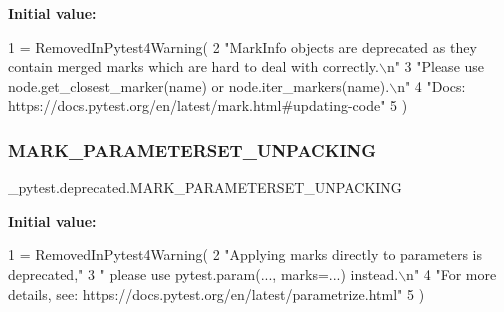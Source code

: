 {\bfseries Initial value\+:}
\begin{DoxyCode}
1 =  RemovedInPytest4Warning(
2     \textcolor{stringliteral}{"MarkInfo objects are deprecated as they contain merged marks which are hard to deal with correctly.\(\backslash\)n"}
3     \textcolor{stringliteral}{"Please use node.get\_closest\_marker(name) or node.iter\_markers(name).\(\backslash\)n"}
4     \textcolor{stringliteral}{"Docs: https://docs.pytest.org/en/latest/mark.html#updating-code"}
5 )
\end{DoxyCode}
\mbox{\label{namespace__pytest_1_1deprecated_a00e2270a0357aece5e55bbf0d1acfd90}} 
\subsubsection{\texorpdfstring{M\+A\+R\+K\+\_\+\+P\+A\+R\+A\+M\+E\+T\+E\+R\+S\+E\+T\+\_\+\+U\+N\+P\+A\+C\+K\+I\+NG}{MARK\_PARAMETERSET\_UNPACKING}}
{\footnotesize\ttfamily \+\_\+pytest.\+deprecated.\+M\+A\+R\+K\+\_\+\+P\+A\+R\+A\+M\+E\+T\+E\+R\+S\+E\+T\+\_\+\+U\+N\+P\+A\+C\+K\+I\+NG}

{\bfseries Initial value\+:}
\begin{DoxyCode}
1 =  RemovedInPytest4Warning(
2     \textcolor{stringliteral}{"Applying marks directly to parameters is deprecated,"}
3     \textcolor{stringliteral}{" please use pytest.param(..., marks=...) instead.\(\backslash\)n"}
4     \textcolor{stringliteral}{"For more details, see: https://docs.pytest.org/en/latest/parametrize.html"}
5 )
\end{DoxyCode}
\mbox{\label{namespace__pytest_1_1deprecated_a3eabdcb2b313da45eb31e36f9ca0ffb7}} 
